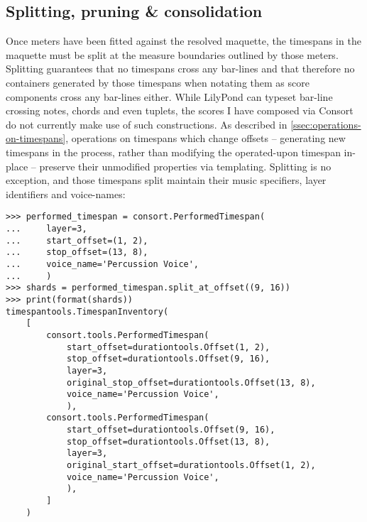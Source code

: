 \subsection{Splitting, pruning \& consolidation}
\label{ssec:splitting-pruning-and-consolidation}

Once meters have been fitted against the resolved maquette, the timespans in
the maquette must be split at the measure boundaries outlined by those meters.
Splitting guarantees that no timespans cross any bar-lines and that therefore
no containers generated by those timespans when notating them as score
components cross any bar-lines either. While LilyPond can typeset bar-line
crossing notes, chords and even tuplets, the scores I have composed via Consort
do not currently make use of such constructions. As described in
\autoref{ssec:operations-on-timespans}, operations on timespans which change
offsets -- generating new timespans in the process, rather than modifying the
operated-upon timespan in-place -- preserve their unmodified properties via
templating. Splitting is no exception, and those timespans split maintain their
music specifiers, layer identifiers and voice-names:

\begin{comment}
<abjad>
performed_timespan = consort.PerformedTimespan(
    layer=3,
    start_offset=(1, 2),
    stop_offset=(13, 8),
    voice_name='Percussion Voice',
    )
shards = performed_timespan.split_at_offset((9, 16))
print(format(shards))
</abjad>
\end{comment}

\begin{abjadbookoutput}
\begin{singlespacing}
\vspace{-0.5\baselineskip}
\begin{verbatim}
>>> performed_timespan = consort.PerformedTimespan(
...     layer=3,
...     start_offset=(1, 2),
...     stop_offset=(13, 8),
...     voice_name='Percussion Voice',
...     )
>>> shards = performed_timespan.split_at_offset((9, 16))
>>> print(format(shards))
timespantools.TimespanInventory(
    [
        consort.tools.PerformedTimespan(
            start_offset=durationtools.Offset(1, 2),
            stop_offset=durationtools.Offset(9, 16),
            layer=3,
            original_stop_offset=durationtools.Offset(13, 8),
            voice_name='Percussion Voice',
            ),
        consort.tools.PerformedTimespan(
            start_offset=durationtools.Offset(9, 16),
            stop_offset=durationtools.Offset(13, 8),
            layer=3,
            original_start_offset=durationtools.Offset(1, 2),
            voice_name='Percussion Voice',
            ),
        ]
    )
\end{verbatim}
\end{singlespacing}
\end{abjadbookoutput}

